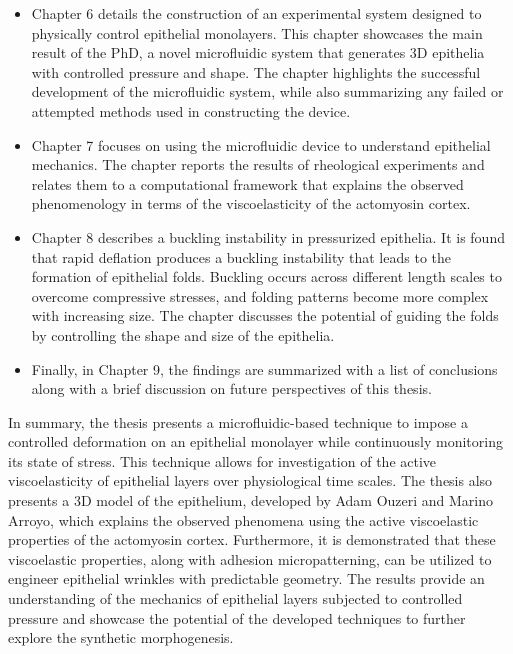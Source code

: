 \begin{itemize}
\item Chapter 6 details the construction of an experimental system designed to physically control epithelial monolayers. This chapter showcases the main result of the PhD, a novel microfluidic system that generates 3D epithelia with controlled pressure and shape. The chapter highlights the successful development of the microfluidic system, while also summarizing any failed or attempted methods used in constructing the device.  
\item Chapter 7 focuses on using the microfluidic device to understand epithelial mechanics. The chapter reports the results of rheological experiments and relates them to a computational framework that explains the observed phenomenology in terms of the viscoelasticity of the actomyosin cortex. 
\item Chapter 8 describes a buckling instability in pressurized epithelia. It is found that rapid deflation produces a buckling instability that leads to the formation of epithelial folds. Buckling occurs across different length scales to overcome compressive stresses, and folding patterns become more complex with increasing size. The chapter discusses the potential of guiding the folds by controlling the shape and size of the epithelia. 
\item Finally, in Chapter 9, the findings are summarized with a list of conclusions along with a brief discussion on future perspectives of this thesis.
\end{itemize}

In summary, the thesis presents a microfluidic-based technique to impose a controlled deformation on an epithelial monolayer while continuously monitoring its state of stress. This technique allows for investigation of the active viscoelasticity of epithelial layers over physiological time scales. The thesis also presents a 3D model of the epithelium, developed by Adam Ouzeri and Marino Arroyo, which explains the observed phenomena using the active viscoelastic properties of the actomyosin cortex. Furthermore, it is demonstrated that these viscoelastic properties, along with adhesion micropatterning, can be utilized to engineer epithelial wrinkles with predictable geometry. The results provide an understanding of the mechanics of epithelial layers subjected to controlled pressure and showcase the potential of the developed techniques to further explore the synthetic morphogenesis.
